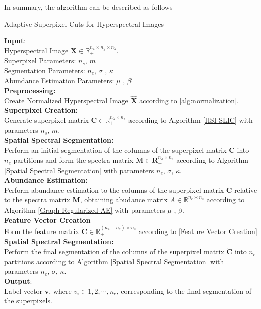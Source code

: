 In summary, the algorithm can be described as follows

\begin{algorithm}[H]
    \caption{Adaptive Superpixel Cuts for Hyperspectral Images}
    \textbf{Input}: \\
    \quad Hyperspectral Image $\mathbf{X} \in \mathbb{R}_+^{n_x \times n_y \times n_\lambda}$. \\
    \quad Superpixel Parameters: $n_s$, $m$\\
    \quad Segmentation Parameters: $n_e$, $\sigma$ , $\kappa$ \\
    \quad Abundance Estimation Parameters: $\mu$ , $\beta$
    \\
    \textbf{Preprocessing:}\\ \quad Create Normalized Hyperspectral Image $\hat{\mathbf{X}}$ according to \eqref{alg:normalization}.
    \\
    \textbf{Superpixel Creation:}\\ \quad Generate superpixel matrix $\mathbf{C} \in \mathbb{R}_+^{n_\lambda \times n_s}$ according to Algorithm \ref{HSI SLIC} with parameters $n_s$, $m$.
    \\
    \textbf{Spatial Spectral Segmentation:}\\ \quad Perform an initial segmentation of the columns of the superpixel matrix $\mathbf{C}$ into $n_e$ partitions and form the spectra matrix $\mathbf{M} \in \mathbf{R}_+^{n_\lambda \times n_e}$ according to Algorithm \ref{Spatial Spectral Segmentation} with parameters $n_e$, $\sigma$, $\kappa$.
    \\
    \textbf{Abundance Estimation:}\\ \quad Perform abundance estimation to the columns of the superpixel matrix $\mathbf{C}$ relative to the spectra matrix $\mathbf{M}$, obtaining abudance matrix $A \in \mathbb{R}_+^{n_e \times n_s} $ according to Algorithm \ref{Graph Regularized AE} with parameters $\mu$ , $\beta$.
    \\
    \textbf{Feature Vector Creation}\\ \quad Form the feature matrix $\tilde{\mathbf{C}} \in \mathbb{R}_+^{(n_\lambda + n_e) \times n_s}$ according to \eqref{Feature Vector Creation}
    \\
    \textbf{Spatial Spectral Segmentation:}\\ \quad Perform the final segmentation of the columns of the superpixel matrix $\tilde{\mathbf{C}}$ into $n_e$ partitions according to Algorithm \ref{Spatial Spectral Segmentation} with parameters $n_e$, $\sigma$, $\kappa$.
    \\
    \textbf{Output}:\\
    \quad Label vector $\mathbf{v}$, where $v_i \in {1,2, \cdots, n_e}$, corresponding to the final segmentation of the superpixels.
  \end{algorithm}

